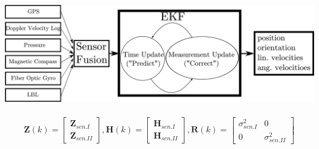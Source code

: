 \documentclass[portrait,final,a0paper]{baposter}
\newcommand{\vect}[1]{\boldsymbol{#1}}
\begin{document}
\begin{poster}
{    \includegraphics[width=0.97\linewidth]{fusion-all.pdf}
\\ \vspace{-25pt}
\\	
\vspace{-1em}
\begin{equation}
\label{eq:fuse}
\vect{Z}(k) = \left[ \begin{array}{c} \vect{Z}_{sen. I} \\ \vect{Z}_{sen. II}  \end{array} \right],
\vect{H}(k) = \left[ \begin{array}{c} \vect{H}_{sen. I} \\ \vect{H}_{sen. II}  \end{array} \right], 
\vect{R}(k) = \left[ \begin{array}{ccc} \sigma_{sen. I}^{2} & 0 \\ 0 & \sigma_{sen. II}^{2} \end{array} \right]
\end{equation}	
  \vspace{-1.2em}
  }

\end{poster}
\end{document}
